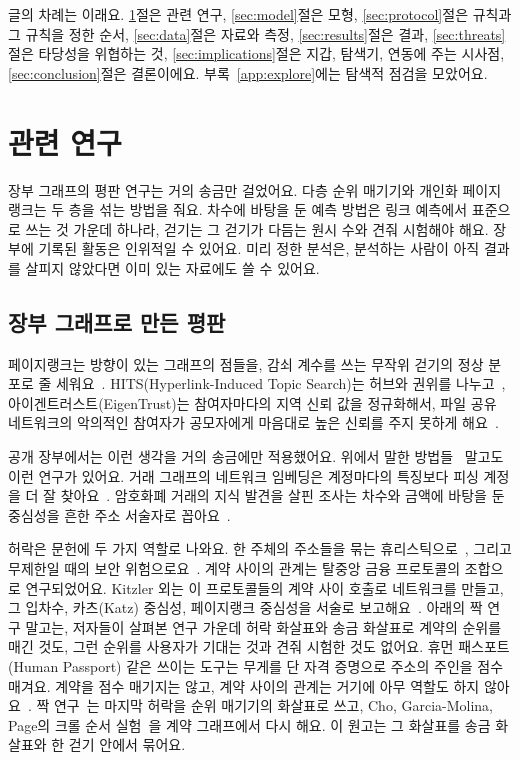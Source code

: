 글의 차례는 이래요. \ref{sec:related}절은 관련 연구, \ref{sec:model}절은 모형, \ref{sec:protocol}절은 규칙과 그 규칙을 정한 순서, \ref{sec:data}절은 자료와 측정, \ref{sec:results}절은 결과, \ref{sec:threats}절은 타당성을 위협하는 것, \ref{sec:implications}절은 지갑, 탐색기, 연동에 주는 시사점, \ref{sec:conclusion}절은 결론이에요. 부록~\ref{app:explore}에는 탐색적 점검을 모았어요.

\section{관련 연구}
\label{sec:related}

\begin{yoji}
장부 그래프의 평판 연구는 거의 송금만 걸었어요. 다층 순위 매기기와 개인화 페이지랭크는 두 층을 섞는 방법을 줘요. 차수에 바탕을 둔 예측 방법은 링크 예측에서 표준으로 쓰는 것 가운데 하나라, 걷기는 그 걷기가 다듬는 원시 수와 견줘 시험해야 해요. 장부에 기록된 활동은 인위적일 수 있어요. 미리 정한 분석은, 분석하는 사람이 아직 결과를 살피지 않았다면 이미 있는 자료에도 쓸 수 있어요.
\end{yoji}

\subsection{장부 그래프로 만든 평판}

페이지랭크는 방향이 있는 그래프의 점들을, 감쇠 계수를 쓰는 무작위 걷기의 정상 분포로 줄 세워요~\cite{page1999pagerank,langville2006pagerank}. HITS(Hyperlink-Induced Topic Search)는 허브와 권위를 나누고~\cite{kleinberg1999hits}, 아이겐트러스트(EigenTrust)는 참여자마다의 지역 신뢰 값을 정규화해서, 파일 공유 네트워크의 악의적인 참여자가 공모자에게 마음대로 높은 신뢰를 주지 못하게 해요~\cite{kamvar2003eigentrust}.

공개 장부에서는 이런 생각을 거의 송금에만 적용했어요. 위에서 말한 방법들~\cite{do2023hodgerank,do2023awp} 말고도 이런 연구가 있어요. 거래 그래프의 네트워크 임베딩은 계정마다의 특징보다 피싱 계정을 더 잘 찾아요~\cite{wu2022phishers}. 암호화폐 거래의 지식 발견을 살핀 조사는 차수와 금액에 바탕을 둔 중심성을 흔한 주소 서술자로 꼽아요~\cite{liu2021knowledge}.

허락은 문헌에 두 가지 역할로 나와요. 한 주체의 주소들을 묶는 휴리스틱으로~\cite{victor2020clustering}, 그리고 무제한일 때의 보안 위험으로요~\cite{wang2022unlimited}. 계약 사이의 관계는 탈중앙 금융 프로토콜의 조합으로 연구되었어요. Kitzler 외는 이 프로토콜들의 계약 사이 호출로 네트워크를 만들고, 그 입차수, 카츠(Katz) 중심성, 페이지랭크 중심성을 서술로 보고해요~\cite{kitzler2023defi}. 아래의 짝 연구 말고는, 저자들이 살펴본 연구 가운데 허락 화살표와 송금 화살표로 계약의 순위를 매긴 것도, 그런 순위를 사용자가 기대는 것과 견줘 시험한 것도 없어요. 휴먼 패스포트(Human Passport) 같은 쓰이는 도구는 무게를 단 자격 증명으로 주소의 주인을 점수 매겨요. 계약을 점수 매기지는 않고, 계약 사이의 관계는 거기에 아무 역할도 하지 않아요~\cite{humanpassportnddocs}. 짝 연구~\cite{kwon2026companion}는 마지막 허락을 순위 매기기의 화살표로 쓰고, Cho, Garcia-Molina, Page의 크롤 순서 실험~\cite{cho1998crawling}을 계약 그래프에서 다시 해요. 이 원고는 그 화살표를 송금 화살표와 한 걷기 안에서 묶어요.

